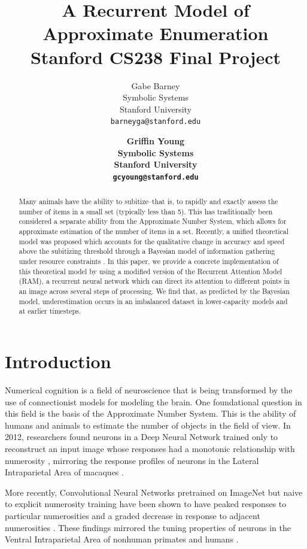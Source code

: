 \documentclass{article}
\title{
  A Recurrent Model of Approximate Enumeration \\
  \vspace{1em}
  \small{\normalfont Stanford CS238 Final Project}  %
}
\author{
  Gabe Barney \\
  Symbolic Systems \\
  Stanford University \\
  \texttt{barneyga@stanford.edu} \\
  \and
  \bf{Griffin Young} \\
  Symbolic Systems \\
  Stanford University \\
  \texttt{gcyoung@stanford.edu} \\
}
\begin{document}
\maketitle

\begin{abstract}
Many animals have the ability to subitize--that is, to rapidly and exactly assess the number of items in a small set (typically less than 5). This has traditionally been considered a separate ability from the Approximate Number System, which allows for approximate estimation of the number of items in a set. Recently, a  unified theoretical model was proposed which accounts for the qualitative change in accuracy and speed above the subitizing threshold through a Bayesian model of information gathering under resource constraints \cite{unified}. In this paper, we  provide a concrete implementation of this theoretical model by using a modified version of the Recurrent Attention Model (RAM), a recurrent neural network which can direct its attention to different points in an image across several steps of processing. We find that, as predicted by the Bayesian model, underestimation occurs in an imbalanced dataset in lower-capacity models and at earlier timesteps. 
\end{abstract}

\section{Introduction}
Numerical cognition is a field of neuroscience that is being transformed by the use of connectionist models for modeling the brain. One foundational question in this field is the basis of the Approximate Number System. This is the ability of humans and animals to estimate the number of objects in the field of view. In 2012, researchers found neurons in a Deep Neural Network trained only to reconstruct an input image whose responses had a monotonic relationship with numerosity \cite{zorzi}, mirroring the response profiles of neurons in the Lateral Intraparietal Area of macaques \cite{roitman}.

More recently, Convolutional Neural Networks pretrained on ImageNet but naive to explicit numerosity training have been shown to have peaked responses to particular numerosities and a graded decrease in response to adjacent numerosities \cite{dewind}\cite{nasr}. These findings mirrored the tuning properties of neurons in the Ventral Intraparietal Area of nonhuman primates \cite{merten} and humans \cite{kutter}.
\end{document}

